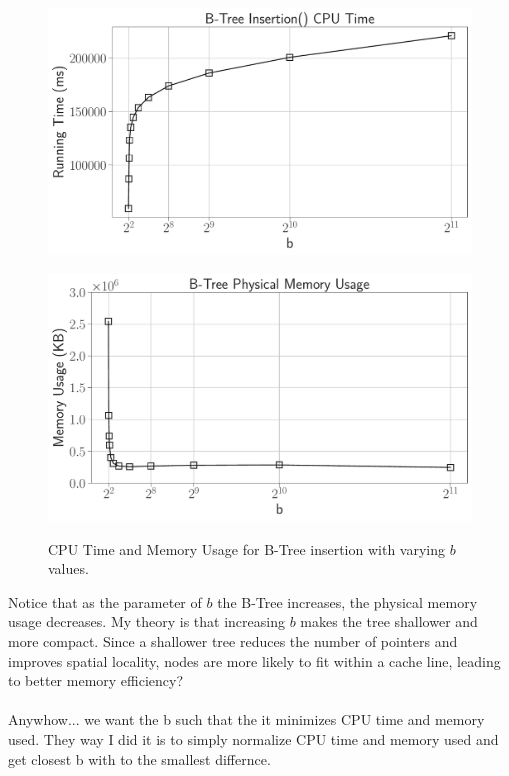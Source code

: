 \documentclass[12pt]{article}
\begin{document}
\begin{figure}[H]
	\centering

	\begin{minipage}{0.5\textwidth}
		\centering
		\includegraphics[width=\linewidth]{../notebook/plot/b-tree_insertion()_cpu_time.pdf}
		\label{fig:cpu_time}
	\end{minipage}\hfill
	\begin{minipage}{0.5\textwidth}
		\centering
		\includegraphics[width=\linewidth]{../notebook/plot/b-tree_physical_memory_usage.pdf}
		\label{fig:physical_memory}
	\end{minipage}\hfill
	\caption{CPU Time and Memory Usage for B-Tree insertion with varying $b$ values.}
\end{figure}

Notice that as the parameter of $b$ the B-Tree increases, the physical memory usage decreases. My theory is that increasing $b$ makes the tree shallower and more compact. Since a shallower tree reduces the number of pointers and improves spatial locality, nodes are more likely to fit within a cache line, leading to better memory efficiency?
\\\\
Anywhow... we want the b such that the it minimizes CPU time and memory used. They way I did it is to simply normalize CPU time and memory used and get closest b with to the smallest differnce. 
\end{document}
